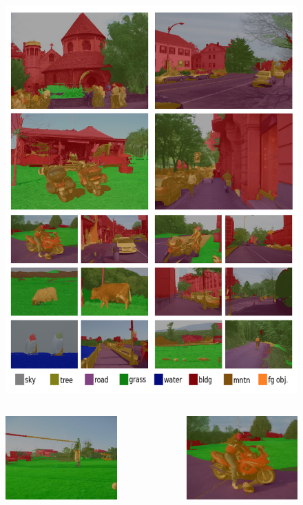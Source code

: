 \documentclass{beamer}
\begin{document}
{
  \begin{figure}[ht]  
  	\begin{center}
  		\includegraphics[height=3.in]{images/ex1.png}   
	\end{center}
  \end{figure}
}
\frame
{
  \begin{columns}
  \begin{figure}[ht]  
	  \begin{center}
		  \includegraphics[width=2.1in]{images/ex1_ext.png}   
	  \end{center}   
  \end{figure}
  \begin{figure}[ht]
	  \begin{center}
		  \includegraphics[width=2.1in]{images/ex1_ext2.png} 
	  \end{center}
  \end{figure}
  \end{columns}
}
\end{document}
